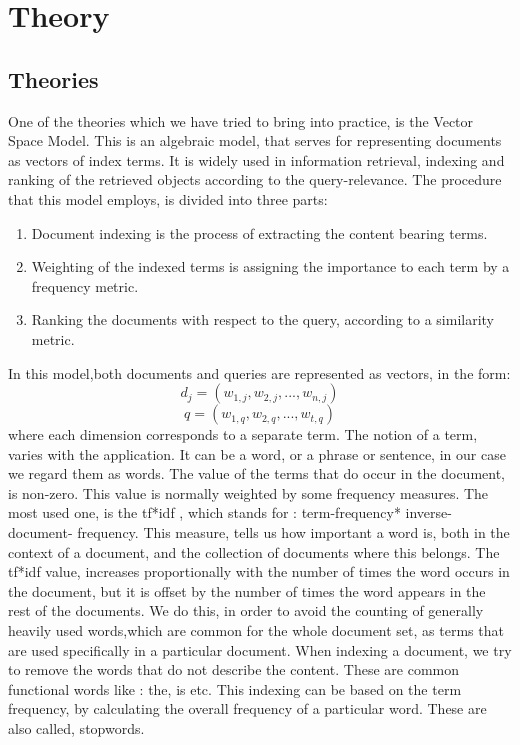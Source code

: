 \chapter{Theory}
\section{Theories}
One of the theories which we have tried to bring into practice, is the Vector Space Model. This is an algebraic model, that serves for representing documents as vectors of index terms. It is widely used in information retrieval, indexing and ranking of the retrieved objects according to the query-relevance. The procedure that this model employs, is divided into three parts:
\begin{enumerate}
\item{Document indexing is the process of extracting the content bearing terms.}
\item{Weighting of the indexed terms is assigning the importance to each term by a frequency metric.}
\item{Ranking the documents with respect to the query, according to a similarity metric.}
\end{enumerate}
In this model,both documents and queries are represented as vectors, in the form:
\[
d_j = (w_{1,j}, w_{2,j}, ..., w_{n,j})
\]
\[
q = (w_{1,q}, w_{2,q}, ..., w_{t,q})
\]
where each dimension corresponds to a separate term. The notion of a term, varies with the application. It can be a word, or a phrase or sentence, in our case we regard them as words. The value of the terms that do occur in the document, is non-zero. This value is normally weighted by some frequency measures. The most used one, is the tf*idf , which stands for : term-frequency* inverse- document- frequency.  This measure, tells us how important a word is, both in the context of a document, and the collection of documents where this belongs. The tf*idf value, increases proportionally with the number of times the word occurs in the document, but it is offset by the number of times the word appears in the rest of the documents. We do this, in order to avoid the counting of generally heavily used words,which are common for the whole document set, as terms that are used specifically in a particular document. 
When indexing a document, we try to remove the words that do not describe the content. These are common functional words like : the, is etc.  This indexing can be based on the term frequency, by calculating the overall frequency of a particular word. These are also called, stopwords. 

